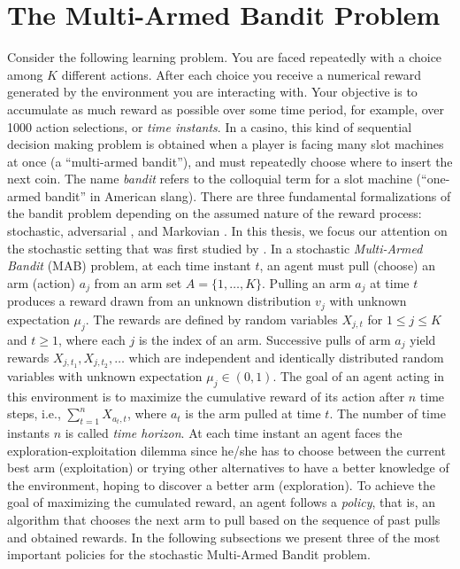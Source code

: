 \section{The Multi-Armed Bandit Problem}
Consider the following learning problem. You are faced repeatedly with a choice among $K$ different  actions. After each choice you receive a numerical reward generated by the environment you are interacting with. Your objective is to accumulate as much reward as possible over some time period, for example, over 1000 action selections, or \emph{time instants}. In a
casino, this kind of sequential decision making problem is obtained when a player is
facing many slot machines at once (a “multi-armed bandit”), and must
repeatedly choose where to insert the next coin. The name \emph{bandit} refers to the colloquial
term for a slot machine (“one-armed bandit” in American slang).
There are three fundamental formalizations of the bandit problem
depending on the assumed nature of the reward process: stochastic, adversarial \citep{Auer1995Adversarial}, and Markovian \citep{Anantharam1987Markovian}. In this thesis, we focus our attention on the stochastic setting that was first studied by \cite{Robbins1952sequential}. In a stochastic \emph{Multi-Armed Bandit} (MAB) problem, at each time instant $t$, an agent must pull (choose) an arm (action) $a_j$ from an arm set $A = \{1,\dots,K\}$. Pulling an arm $a_j$ at time $t$ produces a reward drawn from an unknown distribution $v_j$ with unknown expectation $\mu_j$. The rewards are defined by random variables $X_{j,t}$ for $1\leq j \leq K$ and  $ t \geq 1$, where each $j$ is the index of an arm. Successive pulls of arm $a_j$ yield rewards $X_{j,t_1},X_{j,t_2},\dots$ which are independent and identically distributed random variables with unknown expectation $\mu_j \in (0,1)$. The goal of an agent acting in this environment is to maximize the cumulative reward of its action after $n$ time steps, i.e., $\sum_{t=1}^{n} X_{a_t,t}$, where $a_t$ is the arm pulled at time $t$. The number of time instants $n$ is called \emph{time horizon}. At each time instant an agent faces the exploration-exploitation dilemma since he/she has to choose between the current best arm (exploitation) or trying other alternatives to have a better knowledge of the environment, hoping to discover a better arm (exploration). To achieve the goal of maximizing the cumulated reward, an agent follows a \emph{policy}, that is, an algorithm that chooses the next arm to pull based on the sequence of past pulls and obtained rewards. In the following subsections we present three of the most important policies for the stochastic Multi-Armed Bandit problem.

